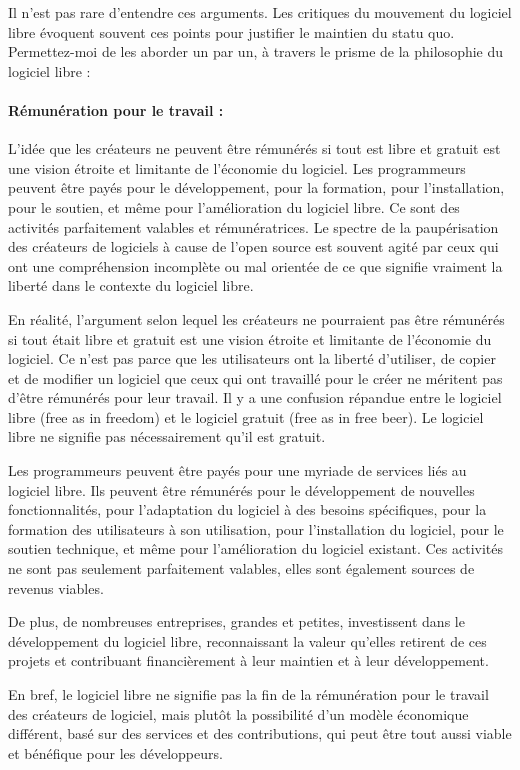 Il n'est pas rare d'entendre ces arguments. Les critiques du mouvement du logiciel libre évoquent souvent ces points pour justifier le maintien du statu quo. Permettez-moi de les aborder un par un, à travers le prisme de la philosophie du logiciel libre :

\paragraph{Rémunération pour le travail :} L'idée que les créateurs ne peuvent être rémunérés si tout est libre et gratuit est une vision étroite et limitante de l'économie du logiciel. Les programmeurs peuvent être payés pour le développement, pour la formation, pour l'installation, pour le soutien, et même pour l'amélioration du logiciel libre. Ce sont des activités parfaitement valables et rémunératrices.
Le spectre de la paupérisation des créateurs de logiciels à cause de l'open source est souvent agité par ceux qui ont une compréhension incomplète ou mal orientée de ce que signifie vraiment la liberté dans le contexte du logiciel libre.

En réalité, l'argument selon lequel les créateurs ne pourraient pas être rémunérés si tout était libre et gratuit est une vision étroite et limitante de l'économie du logiciel. Ce n'est pas parce que les utilisateurs ont la liberté d'utiliser, de copier et de modifier un logiciel que ceux qui ont travaillé pour le créer ne méritent pas d'être rémunérés pour leur travail. Il y a une confusion répandue entre le logiciel libre (free as in freedom) et le logiciel gratuit (free as in free beer). Le logiciel libre ne signifie pas nécessairement qu'il est gratuit.

Les programmeurs peuvent être payés pour une myriade de services liés au logiciel libre. Ils peuvent être rémunérés pour le développement de nouvelles fonctionnalités, pour l'adaptation du logiciel à des besoins spécifiques, pour la formation des utilisateurs à son utilisation, pour l'installation du logiciel, pour le soutien technique, et même pour l'amélioration du logiciel existant. Ces activités ne sont pas seulement parfaitement valables, elles sont également sources de revenus viables.

De plus, de nombreuses entreprises, grandes et petites, investissent dans le développement du logiciel libre, reconnaissant la valeur qu'elles retirent de ces projets et contribuant financièrement à leur maintien et à leur développement.

En bref, le logiciel libre ne signifie pas la fin de la rémunération pour le travail des créateurs de logiciel, mais plutôt la possibilité d'un modèle économique différent, basé sur des services et des contributions, qui peut être tout aussi viable et bénéfique pour les développeurs.

